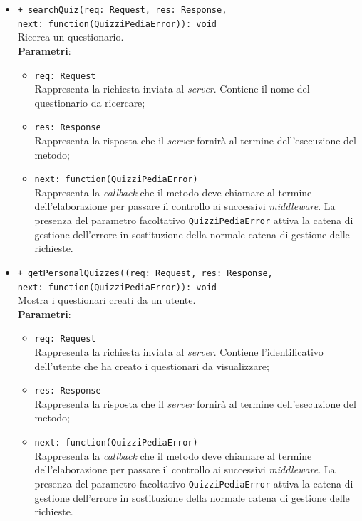 \begin{itemize}
\begin{itemize}
		\item \texttt{+ searchQuiz(req: Request, res: Response, \\next: function(QuizziPediaError)): void}\\
		Ricerca un questionario.\\
		\textbf{Parametri}:
		\begin{itemize}
			\item \texttt{req: Request}\\
			Rappresenta la richiesta inviata al \textit{server}. Contiene il nome del questionario da ricercare;
			\item \texttt{res: Response}\\
			Rappresenta la risposta che il \textit{server} fornirà al termine dell'esecuzione del metodo;
			\item \texttt{next: function(QuizziPediaError)}\\
			Rappresenta la \textit{callback} che il metodo deve chiamare al termine dell'elaborazione per passare il controllo ai successivi \textit{middleware}. La presenza del parametro facoltativo \texttt{QuizziPediaError} attiva la catena di gestione dell'errore in sostituzione della normale catena di gestione delle richieste.
		\end{itemize}
		
		\item \texttt{+ getPersonalQuizzes((req: Request, res: Response, \\next: function(QuizziPediaError)): void}\\
			Mostra i questionari creati da un utente.\\
			\textbf{Parametri}:
			\begin{itemize}
				\item \texttt{req: Request}\\
			Rappresenta la richiesta inviata al \textit{server}. Contiene l'identificativo dell'utente che ha creato i questionari da visualizzare;
				\item \texttt{res: Response}\\
			Rappresenta la risposta che il \textit{server} fornirà al termine dell'esecuzione del metodo;
				\item \texttt{next: function(QuizziPediaError)}\\
			Rappresenta la \textit{callback} che il metodo deve chiamare al termine dell'elaborazione per passare il controllo ai successivi \textit{middleware}. La presenza del parametro facoltativo \texttt{QuizziPediaError} attiva la catena di gestione dell'errore in sostituzione della normale catena di gestione delle richieste.
			\end{itemize}
			

\end{itemize}
\end{itemize}
